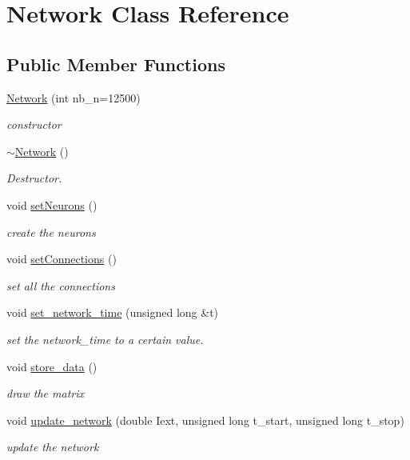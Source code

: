\hypertarget{classNetwork}{\section{Network Class Reference}
\label{classNetwork}
}
\subsection*{Public Member Functions}
\begin{DoxyCompactItemize}
\item 
\hyperlink{classNetwork_a4106cc6f9dcb908579ba596ff058c8d6}{Network} (int nb\-\_\-n=12500)
\begin{DoxyCompactList}\small\item\em constructor \end{DoxyCompactList}\item 
\hyperlink{classNetwork_a7a4e19cdb4bf0c7ecf82baa643831492}{$\sim$\-Network} ()
\begin{DoxyCompactList}\small\item\em Destructor. \end{DoxyCompactList}\item 
void \hyperlink{classNetwork_a2f752efbb227c6f30d7bf6b598632c2c}{set\-Neurons} ()
\begin{DoxyCompactList}\small\item\em create the neurons \end{DoxyCompactList}\item 
void \hyperlink{classNetwork_a6de46151e1d41473e68e4c385c3111ac}{set\-Connections} ()
\begin{DoxyCompactList}\small\item\em set all the connections \end{DoxyCompactList}\item 
void \hyperlink{classNetwork_aa39a2ef43fcd46cbd5e96da6739a6200}{set\-\_\-network\-\_\-time} (unsigned long \&t)
\begin{DoxyCompactList}\small\item\em set the network\-\_\-time to a certain value. \end{DoxyCompactList}\item 
void \hyperlink{classNetwork_a1bf5deec0f7d831e10d5b59b3fe90026}{store\-\_\-data} ()
\begin{DoxyCompactList}\small\item\em draw the matrix \end{DoxyCompactList}\item 
void \hyperlink{classNetwork_a8913d37f6c67caf012fbc9ad970a0386}{update\-\_\-network} (double Iext, unsigned long t\-\_\-start, unsigned long t\-\_\-stop)
\begin{DoxyCompactList}\small\item\em update the network \end{DoxyCompactList}\end{DoxyCompactItemize}


